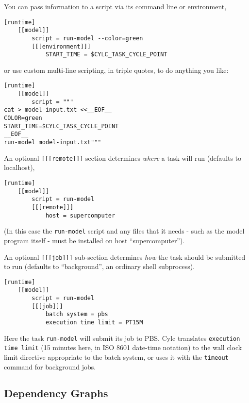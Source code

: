 You can pass information to a script via its command line or environment,

\begin{lstlisting}[language=suiterc]
[runtime]
    [[model]]
        script = run-model --color=green
        [[[environment]]]
            START_TIME = $CYLC_TASK_CYCLE_POINT
\end{lstlisting}

or use custom multi-line scripting, in triple quotes, to do anything you like:
\begin{lstlisting}[language=suiterc]
[runtime]
    [[model]]
        script = """
cat > model-input.txt <<__EOF__
COLOR=green
START_TIME=$CYLC_TASK_CYCLE_POINT
__EOF__
run-model model-input.txt"""
\end{lstlisting}

An optional \lstinline=[[[remote]]]= section determines {\em where} a task
will run (defaults to localhost), 

\begin{lstlisting}[language=suiterc]
[runtime]
    [[model]]
        script = run-model
        [[[remote]]]
            host = supercomputer
\end{lstlisting}
(In this case the \lstinline=run-model= script and any files that it needs -
such as the model program itself - must be installed on host ``supercomputer'').

An optional \lstinline=[[[job]]]= sub-section determines {\em how} the task
should be submitted to run (defaults to ``background'', an ordinary shell
subprocess).
\begin{lstlisting}[language=suiterc]
[runtime]
    [[model]]
        script = run-model
        [[[job]]]
            batch system = pbs
            execution time limit = PT15M
\end{lstlisting}
Here the task \lstinline=run-model= will submit its job to PBS. Cylc translates
\lstinline=execution time limit= (15 minutes here, in ISO 8601 date-time
notation) to the wall clock limit directive appropriate to the batch system, or
uses it with the \lstinline=timeout= command for background jobs. 


\subsection{Dependency Graphs}


